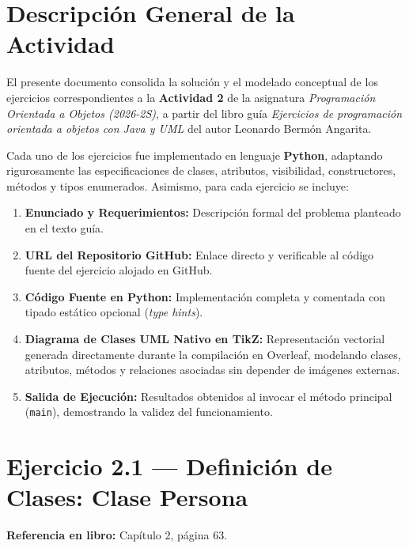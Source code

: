 \documentclass[11pt,a4paper]{article}
\begin{document}
\newpage
\tableofcontents
\newpage

\section{Descripción General de la Actividad}

El presente documento consolida la solución y el modelado conceptual de los ejercicios correspondientes a la \textbf{Actividad 2} de la asignatura \textit{Programación Orientada a Objetos (2026-2S)}, a partir del libro guía \textit{Ejercicios de programación orientada a objetos con Java y UML} del autor Leonardo Bermón Angarita.

Cada uno de los ejercicios fue implementado en lenguaje \textbf{Python}, adaptando rigurosamente las especificaciones de clases, atributos, visibilidad, constructores, métodos y tipos enumerados. Asimismo, para cada ejercicio se incluye:
\begin{enumerate}[leftmargin=*]
    \item \textbf{Enunciado y Requerimientos:} Descripción formal del problema planteado en el texto guía.
    \item \textbf{URL del Repositorio GitHub:} Enlace directo y verificable al código fuente del ejercicio alojado en GitHub.
    \item \textbf{Código Fuente en Python:} Implementación completa y comentada con tipado estático opcional (\textit{type hints}).
    \item \textbf{Diagrama de Clases UML Nativo en TikZ:} Representación vectorial generada directamente durante la compilación en Overleaf, modelando clases, atributos, métodos y relaciones asociadas sin depender de imágenes externas.
    \item \textbf{Salida de Ejecución:} Resultados obtenidos al invocar el método principal (\texttt{main}), demostrando la validez del funcionamiento.
\end{enumerate}

\newpage

\section{Ejercicio 2.1 — Definición de Clases: Clase Persona}
\textbf{Referencia en libro:} Capítulo 2, página 63.
\end{document}
